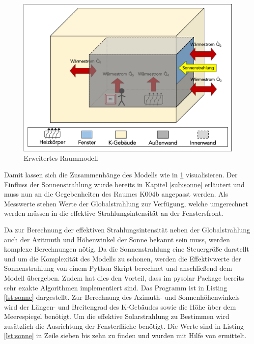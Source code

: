\begin{figure}
\centering
\includegraphics[width=\textwidth]{abbildungen/20160317_raumzwei}
\caption{Erweitertes Raummodell}
\label{fig:raumdrei}
\end{figure}


Damit lassen sich die Zusammenhänge des Modells wie in \ref{fig:raumdrei} visualisieren. Der Einfluss der Sonnenstrahlung wurde bereits in Kapitel \ref{sub:sonne} erläutert und muss nun an die Gegebenheiten des Raumes K004b angepasst werden. Als Messwerte stehen Werte der Globalstrahlung zur Verfügung, welche umgerechnet werden müssen in die effektive Strahlungsintensität an der Fenstersfront.

Da zur Berechnung der effektiven Strahlungsintensität neben der Globalstrahlung auch der Azitmuth und Höhenwinkel der Sonne bekannt sein muss, werden komplexe Berechnungen nötig. Da die Sonnenstrahlung eine Steuergröße darstellt und um die Komplexität des Modells zu schonen, werden die Effektivwerte der Sonnenstrahlung von einem Python Skript berechnet und anschließend dem Modell übergeben. Zudem hat dies den Vorteil, dass im pysolar Package bereits sehr exakte Algorithmen implementiert sind. 
Das Programm ist in Listing \ref{lst:sonne} dargestellt. 
Zur Berechnung des Azimuth- und Sonnenhöhenwinkels wird der Längen- und Breitengrad des K-Gebäudes sowie die Höhe über dem Meerespiegel benötigt. Um die effektive Solarstrahlung zu Bestimmen wird zusätzlich die Ausrichtung der Fensterfläche benötigt. Die Werte sind in Listing \ref{lst:sonne} in Zeile sieben bis zehn zu finden und wurden mit Hilfe von \cite{go15} ermittelt.



